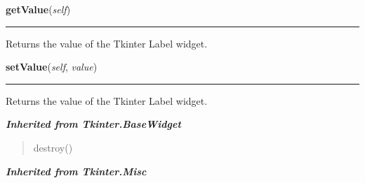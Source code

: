     \label{nMOLDYN:GUI:Widgets:ComboLabel:getValue}

    \vspace{0.5ex}

\hspace{.8\funcindent}\begin{boxedminipage}{\funcwidth}

    \raggedright \textbf{getValue}(\textit{self})

    \vspace{-1.5ex}

    \rule{\textwidth}{0.5\fboxrule}
\setlength{\parskip}{2ex}
    Returns the value of the Tkinter Label widget.

\setlength{\parskip}{1ex}
    \end{boxedminipage}

    \label{nMOLDYN:GUI:Widgets:ComboLabel:setValue}

    \vspace{0.5ex}

\hspace{.8\funcindent}\begin{boxedminipage}{\funcwidth}

    \raggedright \textbf{setValue}(\textit{self}, \textit{value})

    \vspace{-1.5ex}

    \rule{\textwidth}{0.5\fboxrule}
\setlength{\parskip}{2ex}
    Returns the value of the Tkinter Label widget.

\setlength{\parskip}{1ex}
    \end{boxedminipage}


\large{\textbf{\textit{Inherited from Tkinter.BaseWidget}}}

\begin{quote}
destroy()
\end{quote}

\large{\textbf{\textit{Inherited from Tkinter.Misc}}}


